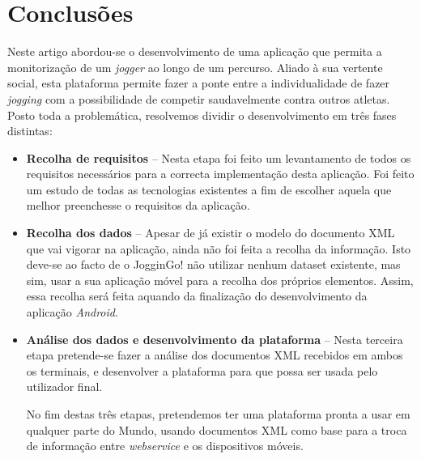 \documentclass[twocolumn,twoside,10pt,a4paper]{article}
\begin{document}
\section{Conclusões}\label{sec:conclusions}

Neste artigo abordou-se o desenvolvimento de uma aplicação que permita a monitorização de um \textit{jogger} ao longo de um percurso. Aliado à sua vertente social, esta plataforma permite fazer a ponte entre a individualidade de fazer \textit{jogging} com a possibilidade de competir saudavelmente contra outros atletas.
Posto toda a problemática, resolvemos dividir o desenvolvimento em três fases distintas:

\begin{itemize}
\item \textbf{Recolha de requisitos} -- Nesta etapa foi feito um levantamento de todos os requisitos necessários para a correcta implementação desta aplicação. Foi feito um estudo de todas as tecnologias existentes a fim de escolher aquela que melhor preenchesse o requisitos da aplicação.
\item \textbf{Recolha dos dados} -- Apesar de já existir o modelo do documento XML que vai vigorar na aplicação, ainda não foi feita a recolha da informação. Isto deve-se ao facto de o JogginGo! não utilizar nenhum dataset existente, mas sim, usar a sua aplicação móvel para a recolha dos próprios elementos. Assim, essa recolha será feita aquando da finalização do desenvolvimento  da aplicação \textit{Android}.
\item \textbf{Análise dos dados e desenvolvimento da plataforma}  -- Nesta terceira etapa pretende-se fazer a análise dos documentos XML recebidos em ambos os terminais, e desenvolver a plataforma para que possa ser usada pelo utilizador final.

No fim destas três etapas, pretendemos ter uma plataforma pronta a usar em qualquer parte do Mundo, usando documentos XML como base para a troca de informação entre 	\textit{webservice} e os dispositivos móveis.
\end{itemize}

\nocite{*}
\renewcommand{\bibname}{Referências}
%
%

%
{}
\end{document}
